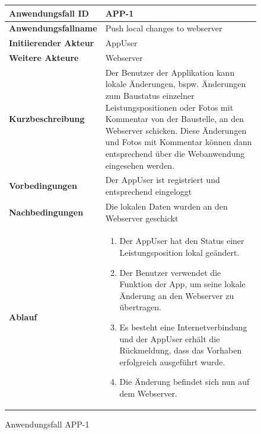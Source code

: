 \newpage

\begin{figure}[h]
	\centering
	\begin{tabularx}{\textwidth}{ X | X }
		\textbf{Anwendungsfall ID} & APP-1 \\ \hline
		\textbf{Anwendungsfallname} & Push local changes to webserver\\ \hline
		\textbf{Initiierender Akteur} & AppUser \\ \hline
		\textbf{Weitere Akteure} & Webserver  \\ \hline
		\textbf{Kurzbeschreibung} & Der Benutzer der Applikation kann lokale \"Anderungen,  bspw. \"Anderungen zum Baustatus einzelner Leistungspositionen oder Fotos mit Kommentar von der Baustelle,  an den Webserver schicken.  Diese \"Anderungen und Fotos mit Kommentar k\"onnen dann entsprechend  \"uber die Webanwendung eingesehen werden.  \\ \hline
		\textbf{Vorbedingungen} & Der AppUser ist registriert und entsprechend eingeloggt \\ \hline
		\textbf{Nachbedingungen} & Die lokalen Daten wurden an den Webserver geschickt\\ \hline
		\textbf{Ablauf} &
			\begin{enumerate}
				\item Der AppUser hat den Status einer Leistungsposition lokal ge\"andert.
				\item Der Benutzer verwendet die Funktion der App,  um seine lokale \"Anderung an den Webserver zu \"ubertragen.
				\item Es besteht eine Internetverbindung und der AppUser erh\"alt die R\"uckmeldung, dass das Vorhaben erfolgreich ausgef\"uhrt wurde.  
				\item Die \"Anderung befindet sich nun auf dem Webserver.
			\end{enumerate}
			\end{tabularx}
	\caption{Anwendungsfall APP-1}
	\label{fig:anwendungsfall-app-tabelle-APP-1-1}
\end{figure}

